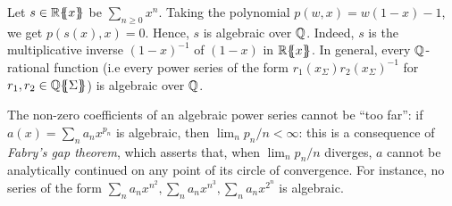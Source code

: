   \begin{example}
		Let $s \in {\mathbb{R}}\{\!\!\{x\}\!\!\}$ be $\sum_{n \geq 0}x^n$. Taking the polynomial $p(w,x) = w(1-x)-1$, we get $p(s(x), x)=0$. Hence, $s$ is algebraic over $\mathbb{Q}$. Indeed, $s$ is the multiplicative inverse $(1-x)^{-1}$ of $(1-x)$ in ${\mathbb{R}}\{\!\!\{x\}\!\!\}$. In general, every $\mathbb{Q}$-rational function (i.e every power series of the form $r_1(x_\Sigma)r_2(x_\Sigma)^{-1}$ for $r_1, r_2 \in {\mathbb{Q}}\{\!\!\{\Sigma\}\!\!\}$) is algebraic over $\mathbb{Q}$. 
  \end{example}	
  \begin{remark}\label{rem:hadamard}
  The non-zero coefficients of an algebraic power series cannot be ``too far'': if $a(x)=\sum_na_n x^{p_n}$ is algebraic, then $\lim_n p_n/n<\infty$: this is a consequence of \emph{Fabry's gap theorem}, which asserts that, when $\lim_n p_n/n$ diverges, $a$ cannot be analytically continued on any point of its circle of convergence.
%  
%   
  For instance, no series of the form $\sum_n a_n x^{n^2},\sum_n a_n x^{n^3}, \sum_n a_nx^{2^n}$ is algebraic.
  \end{remark}
  
